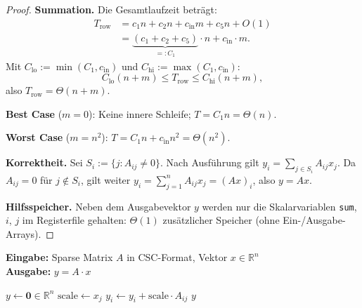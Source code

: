 \documentclass[a4paper,12pt]{report}
\theoremstyle{definition}
\begin{document}
\begin{proof}
		\textbf{Summation.} Die Gesamtlaufzeit beträgt:
		\begin{align*}
			T_{\mathrm{row}} &= c_1 n + c_2 n + c_{\mathrm{in}} m + c_5 n + O(1) \\
			&= \underbrace{(c_1 + c_2 + c_5)}_{=: C_1} \cdot n + c_{\mathrm{in}} \cdot m.
		\end{align*}
		Mit $C_\mathrm{lo} := \min(C_1, c_{\mathrm{in}})$ und $C_{\mathrm{hi}} := \max(C_1, c_{\mathrm{in}})$:
		\[
			C_\mathrm{lo}(n + m) \leq T_{\mathrm{row}} \leq C_{\mathrm{hi}}(n + m),
		\]
		also $T_{\mathrm{row}} = \Theta(n + m)$.

		\textbf{Best Case} ($m = 0$): Keine innere Schleife; $T = C_1 n = \Theta(n)$.

		\textbf{Worst Case} ($m = n^2$): $T = C_1 n + c_{\mathrm{in}} n^2 = \Theta(n^2)$.

		\textbf{Korrektheit.} Sei $S_i := \{j : A_{ij} \neq 0\}$. Nach Ausführung gilt
		$y_i = \sum_{j \in S_i} A_{ij} x_j$.
		Da $A_{ij} = 0$ für $j \notin S_i$, gilt weiter
		$y_i = \sum_{j=1}^n A_{ij} x_j = (Ax)_i$,
		also $y = Ax$.

		\textbf{Hilfsspeicher.} Neben dem Ausgabevektor $y$ werden nur die Skalarvariablen \texttt{sum}, $i$, $j$ im Registerfile gehalten: $\Theta(1)$ zus\"{a}tzlicher Speicher (ohne Ein-/Ausgabe-Arrays).
	\end{proof}

	\begin{algorithm}[H]
		\caption{Spalten-orientierte sparse Matrix-Vektor-Multiplikation}
		\label{alg:column-matvec-detailed}
		\textbf{Eingabe:} Sparse Matrix $A$ in CSC-Format, Vektor $x \in \mathbb{R}^n$ \\
		\textbf{Ausgabe:} $y = A \cdot x$
		\begin{algorithmic}[1]
			\State $y \gets \mathbf{0} \in \mathbb{R}^n$
			\State $\text{scale} \gets x_j$
			\State $y_i \gets y_i + \text{scale} \cdot A_{ij}$
			\EndFor
			\EndIf
			\EndFor
			\State \Return $y$
		\end{algorithmic}
	\end{algorithm}
\end{document}

